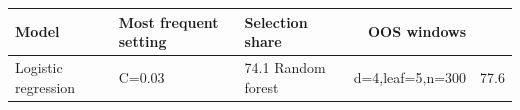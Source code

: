 \begin{tabular}{lllr}
\toprule
Model & Most frequent setting & Selection share & OOS windows \\
\midrule
Logistic regression & C=0.03 & 74.1%
Random forest & d=4,leaf=5,n=300 & 77.6%
\bottomrule
\end{tabular}
